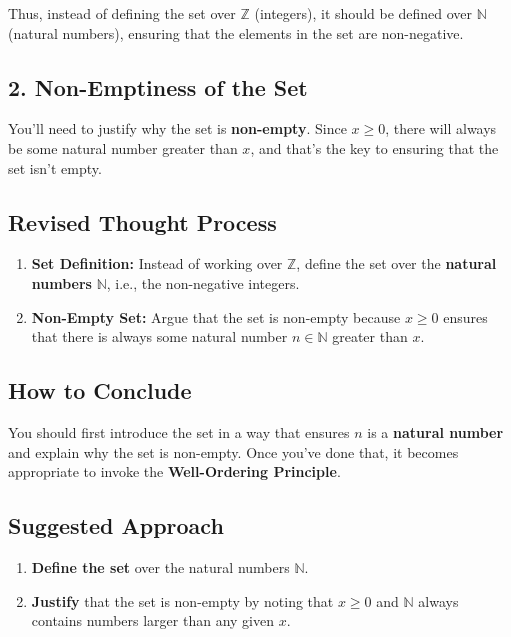 \documentclass{article}
\begin{document}
Thus, instead of defining the set over \( \mathbb{Z} \) (integers), it should be defined over \( \mathbb{N} \) (natural numbers), ensuring that the elements in the set are non-negative.

\subsection*{2. Non-Emptiness of the Set}

You’ll need to justify why the set is \textbf{non-empty}. Since \( x \geq 0 \), there will always be some natural number greater than \( x \), and that's the key to ensuring that the set isn’t empty.

\subsection*{Revised Thought Process}

\begin{enumerate}
    \item \textbf{Set Definition:} Instead of working over \( \mathbb{Z} \), define the set over the \textbf{natural numbers} \( \mathbb{N} \), i.e., the non-negative integers.
    \item \textbf{Non-Empty Set:} Argue that the set is non-empty because \( x \geq 0 \) ensures that there is always some natural number \( n \in \mathbb{N} \) greater than \( x \).
\end{enumerate}

\subsection*{How to Conclude}

You should first introduce the set in a way that ensures \( n \) is a \textbf{natural number} and explain why the set is non-empty. Once you’ve done that, it becomes appropriate to invoke the \textbf{Well-Ordering Principle}.

\subsection*{Suggested Approach}

\begin{enumerate}
    \item \textbf{Define the set} over the natural numbers \( \mathbb{N} \).
    \item \textbf{Justify} that the set is non-empty by noting that \( x \geq 0 \) and \( \mathbb{N} \) always contains numbers larger than any given \( x \).
\end{enumerate}
\end{document}
